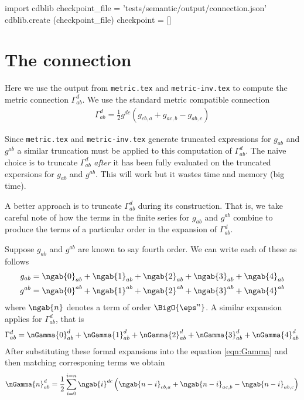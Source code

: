 \documentclass[12pt]{cdblatex}
\begin{document}

\bgroup
{}
\begin{cadabra}
   import cdblib
   checkpoint_file = 'tests/semantic/output/connection.json'
   cdblib.create (checkpoint_file)
   checkpoint = []
\end{cadabra}
\egroup

\section*{The connection}

Here we use the output from {\tt metric.tex} and {\tt metric-inv.tex} to compute the metric connection
$\Gamma^{d}_{ab}$. We use the standard metric compatible connection
\begin{align}
   \label{eqn:Gamma}
   \Gamma^{d}_{ab} = \frac{1}{2} g^{dc}\left( g_{cb,a} + g_{ac,b} - g_{ab,c} \right)
\end{align}

Since {\tt metric.tex} and {\tt metric-inv.tex} generate truncated expressions for $g_{ab}$ and
$g^{ab}$ a similar truncation must be applied to this computation of $\Gamma^{d}_{ab}$. The naive
choice is to truncate $\Gamma^{d}_{ab}$ \emph{after} it has been fully evaluated on the truncated
expersions for $g_{ab}$ and $g^{ab}$. This will work but it wastes time and memory (big time).

A better approach is to truncate $\Gamma^{d}_{ab}$ during its construction. That is, we take
careful note of how the terms in the finite series for $g_{ab}$ and $g^{ab}$ combine to produce
the terms of a particular order in the expansion of $\Gamma^{d}_{ab}$.

Suppose $g_{ab}$ and $g^{ab}$ are known to say fourth order. We can write each of these as follows
\begin{align}
   g_{ab} &= \ngab{0}_{ab} + \ngab{1}_{ab} + \ngab{2}_{ab} + \ngab{3}_{ab} + \ngab{4}_{ab}\\
   g^{ab} &= \ngab{0}^{ab} + \ngab{1}^{ab} + \ngab{2}^{ab} + \ngab{3}^{ab} + \ngab{4}^{ab}
\end{align}
where $\ngab{n}$ denotes a term of order $\BigO{\eps^n}$. A similar expansion applies for $\Gamma^{d}_{ab}$, that is
\begin{align}
   \Gamma^{d}_{ab} = \nGamma{0}^{d}_{ab}
                   + \nGamma{1}^{d}_{ab}
                   + \nGamma{2}^{d}_{ab}
                   + \nGamma{3}^{d}_{ab}
                   + \nGamma{4}^{d}_{ab}
\end{align}
After substituting these formal expansions into the equation \eqref{eqn:Gamma} and then matching
corresponing terms we obtain
\begin{align}
   \nGamma{n}^{d}_{ab}
   =
   \frac{1}{2} \sum_{i=0}^{i=n} \ngab{i}^{dc}\left( \ngab{n-i}_{cb,a} + \ngab{n-i}_{ac,b} - \ngab{n-i}_{ab,c} \right)
\end{align}
\end{document}
